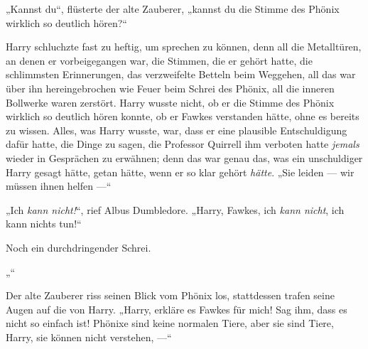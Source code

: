 „Kannst du“, flüsterte der alte Zauberer, „kannst du die Stimme des Phönix wirklich so deutlich hören?“

Harry schluchzte fast zu heftig, um sprechen zu können, denn all die Metalltüren, an denen er vorbeigegangen war, die Stimmen, die er gehört hatte, die schlimmsten Erinnerungen, das verzweifelte Betteln beim Weggehen, all das war über ihn hereingebrochen wie Feuer beim Schrei des Phönix, all die inneren Bollwerke waren zerstört. Harry wusste nicht, ob er die Stimme des Phönix wirklich so deutlich hören konnte, ob er Fawkes verstanden hätte, ohne es bereits zu wissen. Alles, was Harry wusste, war, dass er eine plausible Entschuldigung dafür hatte, die Dinge zu sagen, die Professor Quirrell ihm verboten hatte \emph{jemals} wieder in Gesprächen zu erwähnen; denn das war genau das, was ein unschuldiger Harry gesagt hätte, getan hätte, wenn er so klar gehört \emph{hätte}.
„Sie leiden — wir müssen ihnen helfen —“

„Ich \emph{kann nicht!}“, rief Albus Dumbledore.
„Harry, Fawkes, ich \emph{kann nicht}, ich kann nichts tun!“

Noch ein durchdringender Schrei.

„“

Der alte Zauberer riss seinen Blick vom Phönix los, stattdessen trafen seine Augen auf die von Harry.
„Harry, erkläre es Fawkes für mich! Sag ihm, dass es nicht so einfach ist! Phönixe sind keine normalen Tiere, aber sie sind Tiere, Harry, sie können nicht verstehen, —“

